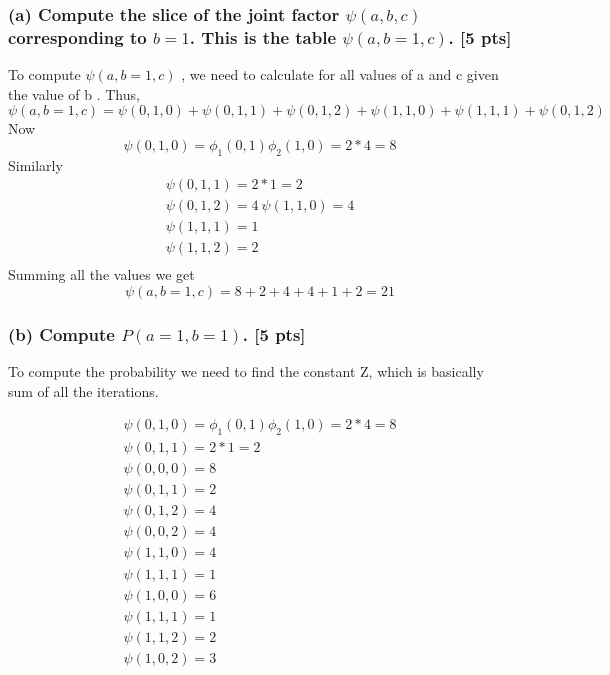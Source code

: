 \documentclass[twoside,11pt]{article}\usepackage{amsmath,amsfonts,amsthm,fullpage}
\begin{document}
\subsubsection*{(a) Compute the slice of the joint factor $\psi(a,b,c)$ corresponding to $b = 1$. This is the table $\psi(a,b=1,c)$. [5 pts]}
To compute $\psi(a,b=1,c)$ , we need to calculate for all values of a and c given the value of b .
Thus,
\begin{equation}
\psi(a,b=1,c) = \psi(0,1,0) + \psi(0,1,1)+ \psi(0,1,2)+ \psi(1,1,0)+ \psi(1,1,1)+ \psi(0,1,2)
\end{equation}
Now 
\begin{equation}
\psi(0,1,0) = \phi_1(0,1)\phi_2(1,0) = 2*4=8
\end{equation}
Similarly
\begin{equation}
\begin{split}
\psi(0,1,1) =  2*1=2\\
\psi(0,1,2) =  4\
\psi(1,1,0) =  4\\
\psi(1,1,1) =  1\\
\psi(1,1,2) =  2\\
\end{split}
\end{equation}
Summing all the values we get
\begin{equation}
\psi(a,b=1,c) = 8+2+4+4+1+2=21
\end{equation}
\subsubsection*{(b) Compute $P(a = 1,b = 1)$. [5 pts]}
To compute the probability we need to find the constant Z, which is basically sum of all the iterations.

\begin{equation}
\begin{split}
\psi(0,1,0) = \phi_1(0,1)\phi_2(1,0) = 2*4=8\\
\psi(0,1,1) =  2*1=2\\
\psi(0,0,0) =  8\\
\psi(0,1,1) =  2\\
\psi(0,1,2) =  4\\
\psi(0,0,2) =  4\\
\psi(1,1,0) = 4\\
\psi(1,1,1) = 1\\
\psi(1,0,0) =  6\\
\psi(1,1,1) =  1\\
\psi(1,1,2) =  2\\
\psi(1,0,2) =  3\\
\end{split}
\end{equation}
\end{document}
